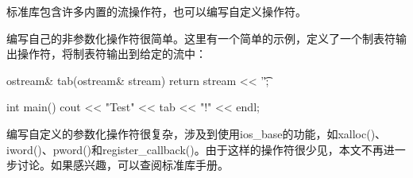 
标准库包含许多内置的流操作符，也可以编写自定义操作符。

编写自己的非参数化操作符很简单。这里有一个简单的示例，定义了一个制表符输出操作符，将制表符输出到给定的流中：

\begin{cpp}
ostream& tab(ostream& stream) { return stream << '\t'; }

int main()
{
    cout << "Test" << tab << "!" << endl;
}
\end{cpp}

编写自定义的参数化操作符很复杂，涉及到使用ios\_base的功能，如xalloc()、iword()、pword()和register\_callback()。由于这样的操作符很少见，本文不再进一步讨论。如果感兴趣，可以查阅标准库手册。



